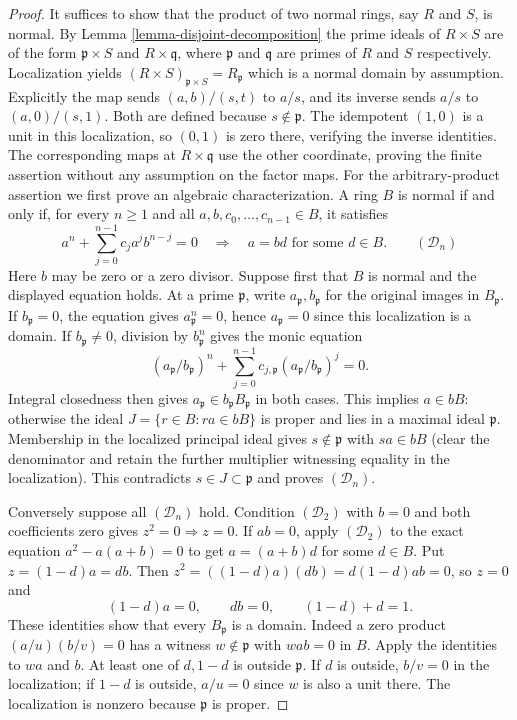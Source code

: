 \begin{proof}
It suffices to show that the product of two normal rings, say $R$ and $S$, is
normal. By Lemma \ref{lemma-disjoint-decomposition} the prime ideals of
$R\times S$ are of the form $\mathfrak{p}\times S$ and $R\times
\mathfrak{q}$, where $\mathfrak{p}$ and $\mathfrak{q}$ are primes of $R$
and $S$ respectively. Localization yields 
$(R\times S)_{\mathfrak{p}\times S}=R_{\mathfrak{p}}$ which is a normal domain
by assumption. Explicitly the map sends
$(a,b)/(s,t)$ to $a/s$, and its inverse sends $a/s$ to
$(a,0)/(s,1)$. Both are defined because $s\notin\mathfrak p$.
The idempotent $(1,0)$ is a unit in this localization, so $(0,1)$
is zero there, verifying the inverse identities. The corresponding
maps at $R\times\mathfrak q$ use the other coordinate, proving
the finite assertion without any assumption on the factor maps.
\medskip\noindent
For the arbitrary-product assertion we first prove an algebraic
characterization. A ring $B$ is normal if and only if, for every
$n\geq1$ and all $a,b,c_0,\ldots,c_{n-1}\in B$, it satisfies
$$
a^n+\sum_{j=0}^{n-1}c_ja^jb^{n-j}=0
\quad\Longrightarrow\quad a=bd\text{ for some }d\in B.
\qquad(\mathcal D_n)
$$
Here $b$ may be zero or a zero divisor.
Suppose first that $B$ is normal and the displayed equation holds.
At a prime $\mathfrak p$, write $a_{\mathfrak p},b_{\mathfrak p}$
for the original images in $B_{\mathfrak p}$. If
$b_{\mathfrak p}=0$, the equation gives $a_{\mathfrak p}^n=0$,
hence $a_{\mathfrak p}=0$ since this localization is a domain.
If $b_{\mathfrak p}\ne0$, division by $b_{\mathfrak p}^n$
gives the monic equation
$$
(a_{\mathfrak p}/b_{\mathfrak p})^n+
\sum_{j=0}^{n-1}c_{j,\mathfrak p}
 (a_{\mathfrak p}/b_{\mathfrak p})^j=0.
$$
Integral closedness then gives
$a_{\mathfrak p}\in b_{\mathfrak p}B_{\mathfrak p}$ in both cases.
This implies $a\in bB$: otherwise the ideal
$J=\{r\in B:ra\in bB\}$ is proper and lies in a maximal ideal
$\mathfrak p$. Membership in the localized principal ideal gives
$s\notin\mathfrak p$ with $sa\in bB$ (clear the denominator and
retain the further multiplier witnessing equality in the localization).
This contradicts $s\in J\subset\mathfrak p$ and proves
$(\mathcal D_n)$.

Conversely suppose all $(\mathcal D_n)$ hold. Condition
$(\mathcal D_2)$ with $b=0$ and both coefficients zero gives
$z^2=0\Rightarrow z=0$. If $ab=0$, apply $(\mathcal D_2)$
to the exact equation $a^2-a(a+b)=0$ to get
$a=(a+b)d$ for some $d\in B$. Put
$z=(1-d)a=db$. Then
$z^2=((1-d)a)(db)=d(1-d)ab=0$, so $z=0$ and
$$
(1-d)a=0,\qquad db=0,\qquad (1-d)+d=1.
$$
These identities show that every $B_{\mathfrak p}$ is a domain.
Indeed a zero product $(a/u)(b/v)=0$ has a witness
$w\notin\mathfrak p$ with $wab=0$ in $B$. Apply the identities
to $wa$ and $b$. At least one of $d,1-d$ is outside
$\mathfrak p$. If $d$ is outside, $b/v=0$ in the localization;
if $1-d$ is outside, $a/u=0$ since $w$ is also a unit there.
The localization is nonzero because $\mathfrak p$ is proper.


\end{proof}
